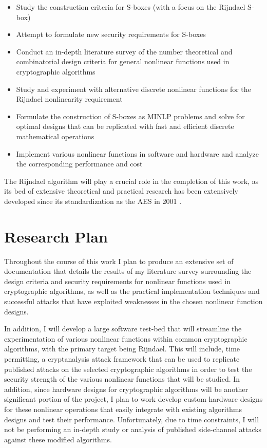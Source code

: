\documentclass[10pt]{article}
\begin{document}
\begin{itemize}
	\item Study the construction criteria for S-boxes (with a focus on the Rijndael S-box)
	\item Attempt to formulate new security requirements for S-boxes
	\item Conduct an in-depth literature survey of the number theoretical and combinatorial design criteria for general nonlinear functions used in cryptographic algorithms
	\item Study and experiment with alternative discrete nonlinear functions for the Rijndael nonlinearity requirement
	\item Formulate the construction of S-boxes as MINLP problems and solve for optimal designs that can be replicated with fast and efficient discrete mathematical operations
	\item Implement various nonlinear functions in software and hardware and analyze the corresponding performance and cost
\end{itemize}

The Rijndael algorithm will play a crucial role in the completion of this work, as its bed of extensive theoretical and practical research has been extensively developed since its standardization as the AES in 2001 \cite{FIPS197}. 

\section{Research Plan}
Throughout the course of this work I plan to produce an extensive set of documentation that details the results of my literature survey surrounding the design criteria and security requirements for nonlinear functions used in cryptographic algorithms, as well as the practical implementation techniques and successful attacks that have exploited weaknesses in the chosen nonlinear function designs. 

In addition, I will develop a large software test-bed that will streamline the experimentation of various nonlinear functions within common cryptographic algorithms, with the primary target being Rijndael. This will include, time permitting, a cryptanalysis attack framework that can be used to replicate published attacks on the selected cryptographic algorithms in order to test the security strength of the various nonlinear functions that will be studied. In addition, since hardware designs for cryptographic algorithms will be another significant portion of the project, I plan to work develop custom hardware designs for these nonlinear operations that easily integrate with existing algorithms designs and test their performance. Unfortunately, due to time constraints, I will not be performing an in-depth study or analysis of published side-channel attacks against these modified algorithms.




\end{document}
